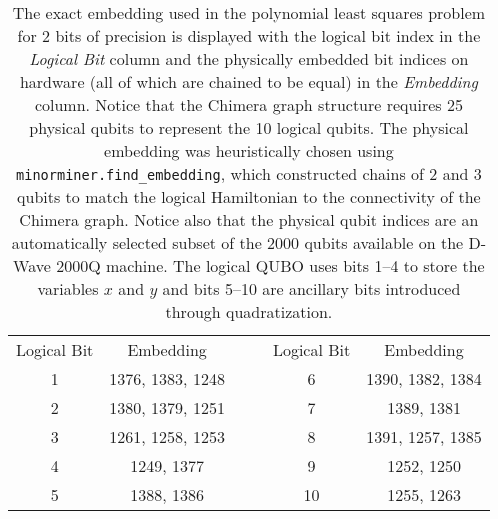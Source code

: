 \begin{table}
    \centering
    \begin{tabular}{c|c c c|c}
      Logical Bit & Embedding &$\quad$& Logical Bit & Embedding \\ \cline{1-2}\cline{4-5}
      1 & 1376, 1383, 1248 && 6  & 1390, 1382, 1384 \\
      2 & 1380, 1379, 1251 && 7  & 1389, 1381        \\
      3 & 1261, 1258, 1253 && 8  & 1391, 1257, 1385 \\
      4 & 1249, 1377       && 9  & 1252, 1250       \\
      5 & 1388, 1386       && 10 & 1255, 1263
    \end{tabular}
    \caption{The exact embedding used in the polynomial least squares problem for $2$ bits of precision is displayed with the logical bit index in the \textit{Logical Bit} column and the physically embedded bit indices on hardware (all of which are chained to be equal) in the \textit{Embedding} column. Notice that the Chimera graph structure requires 25 physical qubits to represent the 10 logical qubits. The physical embedding was heuristically chosen using { \tt minorminer.find_embedding}, which constructed chains of 2 and 3 qubits to match the logical Hamiltonian to the connectivity of the Chimera graph. Notice also that the physical qubit indices are an automatically selected subset of the 2000 qubits available on the D-Wave 2000Q machine. The logical QUBO uses bits 1--4 to store the variables $x$ and $y$ and bits 5--10 are ancillary bits introduced through quadratization.}
    \label{tab:poly_ls_embedding}
\end{table}


